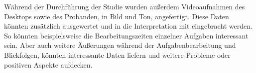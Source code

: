 Während der Durchführung der Studie wurden außerdem Videoaufnahmen des Desktops sowie des Probanden, in Bild und Ton, angefertigt. Diese Daten könnten zusätzlich ausgewertet und in die Interpretation mit eingebracht werden. So könnten beispielsweise die Bearbeitungszeiten einzelner Aufgaben interessant sein. Aber auch weitere Äußerungen während der Aufgabenbearbeitung und Blickfolgen, könnten interessante Daten liefern und weitere Probleme oder positiven Aspekte aufdecken.



























